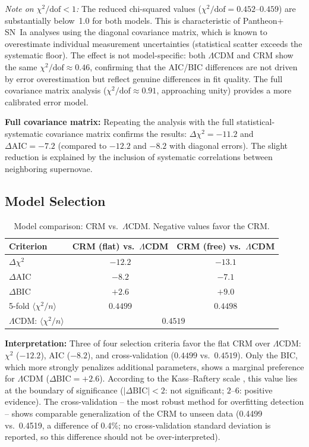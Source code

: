 \documentclass[aps,prd,twocolumn,superscriptaddress,nofootinbib]{revtex4-2}
\begin{document}
\textit{Note on $\chi^2/\mathrm{dof} < 1$:} The reduced chi-squared values ($\chi^2/\mathrm{dof} = 0.452$--$0.459$) are substantially below~1.0 for both models. This is characteristic of Pantheon+ SN~Ia analyses using the diagonal covariance matrix, which is known to overestimate individual measurement uncertainties (statistical scatter exceeds the systematic floor). The effect is not model-specific: both $\Lambda$CDM and CRM show the same $\chi^2/\mathrm{dof} \approx 0.46$, confirming that the AIC/BIC differences are not driven by error overestimation but reflect genuine differences in fit quality. The full covariance matrix analysis ($\chi^2/\mathrm{dof} \approx 0.91$, approaching unity) provides a more calibrated error model.

\textbf{Full covariance matrix:} Repeating the analysis with the full statistical-systematic covariance matrix confirms the results: $\Delta\chi^2 = -11.2$ and $\Delta\mathrm{AIC} = -7.2$ (compared to $-12.2$ and $-8.2$ with diagonal errors). The slight reduction is explained by the inclusion of systematic correlations between neighboring supernovae.

\subsection{Model Selection}
\label{subsec:modelselection}

\begin{table}[htbp]
\centering
\caption{Model comparison: CRM vs.\ $\Lambda$CDM. Negative values favor the CRM.}
\label{tab:comparison}
\begin{tabular}{lcc}
\toprule
\textbf{Criterion} & CRM (flat) vs.\ $\Lambda$CDM & CRM (free) vs.\ $\Lambda$CDM \\
\midrule
$\Delta\chi^2$ & $\mathbf{-12.2}$ & $-13.1$ \\
$\Delta$AIC & $\mathbf{-8.2}$ & $-7.1$ \\
$\Delta$BIC & $+2.6$ & $+9.0$ \\
\midrule
5-fold $\langle\chi^2/n\rangle$ & $\mathbf{0.4499}$ & $0.4498$ \\
$\Lambda$CDM: $\langle\chi^2/n\rangle$ & \multicolumn{2}{c}{$0.4519$} \\
\bottomrule
\end{tabular}
\end{table}

\textbf{Interpretation:} Three of four selection criteria favor the flat CRM over $\Lambda$CDM: $\chi^2$ ($-12.2$), AIC ($-8.2$), and cross-validation ($0.4499$ vs.\ $0.4519$). Only the BIC, which more strongly penalizes additional parameters, shows a marginal preference for $\Lambda$CDM ($\Delta\mathrm{BIC} = +2.6$). According to the Kass--Raftery scale \cite{KassRaftery1995}, this value lies at the boundary of significance ($|\Delta\mathrm{BIC}| < 2$: not significant; $2$--$6$: positive evidence). The cross-validation -- the most robust method for overfitting detection -- shows comparable generalization of the CRM to unseen data (0.4499 vs.\ 0.4519, a difference of 0.4\%; no cross-validation standard deviation is reported, so this difference should not be over-interpreted).
\end{document}
